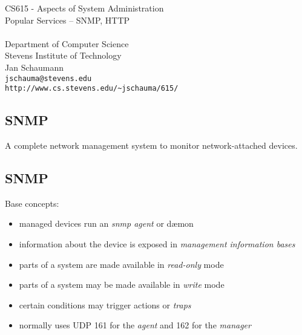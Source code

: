 \documentclass[xga]{xdvislides}
\begin{document}
\setfontphv

\lhead{\slidetitle}                               %
\cfoot{\relax}                               %
\rfoot{\Gray{\today}}

\newcommand{\smallish}{\fontsize{16}{16}\selectfont}

\vspace*{\fill}
\begin{center}
	\Hugesize
		CS615 - Aspects of System Administration\\ [1em]
		Popular Services -- SNMP, HTTP\\ [1em]
	\hspace*{5mm}\blueline\\ [1em]
	\Normalsize
		Department of Computer Science\\
		Stevens Institute of Technology\\
		Jan Schaumann\\
		\verb+jschauma@stevens.edu+\\
		\verb+http://www.cs.stevens.edu/~jschauma/615/+
\end{center}
\vspace*{\fill}

\subsection{SNMP}
\vspace{.5in}
\begin{center}
	\Huge
	A complete network management system to monitor network-attached devices.
\end{center}
\Normalsize

\subsection{SNMP}
Base concepts:
\begin{itemize}
	\item managed devices run an {\em snmp agent} or d\ae mon
	\item information about the device is exposed in {\em management information bases}
	\item parts of a system are made available in {\em read-only} mode
	\item parts of a system may be made available in {\em write} mode
	\item certain conditions may trigger actions or {\em traps}
	\item normally uses UDP 161 for the {\em agent} and 162 for the {\em manager}
\end{itemize}
\end{document}
